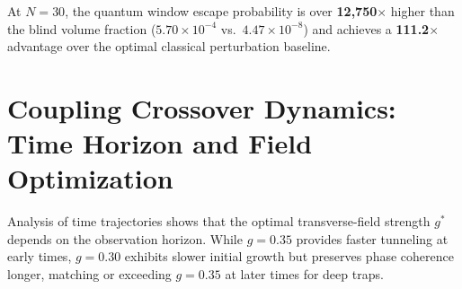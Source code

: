 \documentclass[12pt,a4paper]{report}
\begin{document}
At $N = 30$, the quantum window escape probability is over \textbf{12{,}750$\times$} higher than the blind volume fraction ($5.70 \times 10^{-4}$ vs.\ $4.47 \times 10^{-8}$) and achieves a \textbf{111.2$\times$} advantage over the optimal classical perturbation baseline.

\section{Coupling Crossover Dynamics: Time Horizon and Field Optimization}
\label{sec:coupling_crossover}
Analysis of time trajectories shows that the optimal transverse-field strength $g^*$ depends on the observation horizon. While $g = 0.35$ provides faster tunneling at early times, $g = 0.30$ exhibits slower initial growth but preserves phase coherence longer, matching or exceeding $g = 0.35$ at later times for deep traps.
\end{document}
